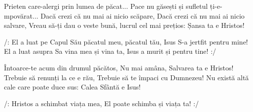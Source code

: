 \beginverse
Prieten care-alergi prin lumea de păcat...
Pace nu găsești și sufletul ți-e-mpovărat...
Dacă crezi că nu mai ai nicio scăpare,
Dacă crezi că nu mai ai nicio salvare,
Vreau să-ți dau o veste bună, lucrul cel mai prețios:
Șansa ta e Hristos!
\endverse

\beginchorus
/: El a luat pe Capul Său păcatul meu, păcatul tău,
Isus S-a jertfit pentru mine!
El a luat asupra Sa vina mea și vina ta,
Isus a murit și pentru tine! :/
\endchorus

\beginverse
Întoarce-te acum din drumul păcătos,
Nu mai amâna, Salvarea ta e Hristos!
Trebuie să renunți la ce e rău,
Trebuie să te împaci cu Dumnezeu!
Nu există altă cale care poate duce sus:
Calea Sfântă e Isus!
\endverse

\beginverse*
/: Hristos a schimbat viața mea,
El poate schimba și viața ta! :/
\endverse
\endsong